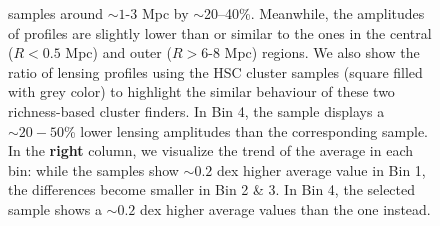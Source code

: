 \documentclass[fleqn,usenatbib,useAMS,english]{mnras}
\begin{document}
\begin{figure}
{           samples around $\sim 1$-3 Mpc by $\sim$20--40\%.
          Meanwhile, the amplitudes of \redm{} \dsigma{} profiles are slightly lower than or
          similar to the  ones in the central ($R < 0.5$ Mpc) and outer
          ($R>6$-8 Mpc) regions.
          We also show the ratio of lensing profiles using the HSC \camira{} cluster samples
          (square filled with grey color) to highlight the similar behaviour of these two
          richness-based cluster finders.
          In Bin 4, the \redm{} sample displays a $\sim 20-50$\% lower lensing amplitudes than
          the corresponding  sample.
          In the \textbf{right} column, we visualize the trend of the average \mvir{} in each bin:
          while the \redm{} samples show $\sim 0.2$ dex higher average \mvir{} value in Bin 1,
          the differences become smaller in Bin 2 \& 3.
          In Bin 4, the  selected sample shows a $\sim 0.2$ dex higher average
          \mvir{} values than the \redm{} one instead.
          }
      \label{fig:mout_richness}
  \end{figure}
\end{document}
